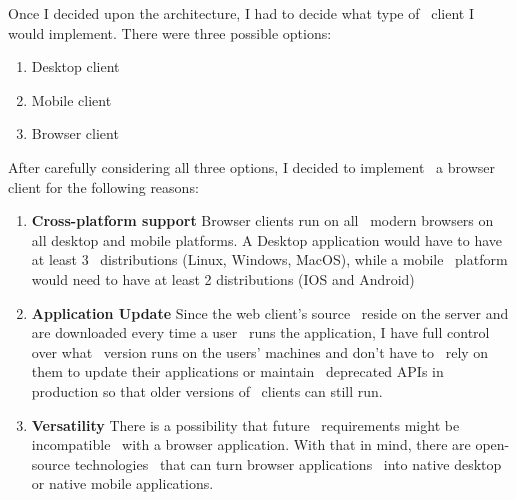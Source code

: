 Once I decided upon the architecture, I had to decide what type of \
client I would implement.
There were three possible options:
\begin{enumerate}
    \item Desktop client
    \item Mobile client
    \item Browser client
\end{enumerate}

After carefully considering all three options, I decided to implement \
a browser client for the following reasons:
\begin{enumerate}
    \item \textbf{Cross-platform support} Browser clients run on all \
            modern browsers on all desktop and mobile platforms.
            A Desktop application would have to have at least  3 \
            distributions (Linux, Windows, MacOS), while a mobile \
            platform would need to have at least 2 distributions
            (IOS and Android)
    \item \textbf{Application Update} Since the web client's source \
            reside on the server and are downloaded every time a user \
            runs the application, I have full control over what \
            version runs on the users' machines and don't have to \
            rely on them to update their applications or maintain \
            deprecated APIs in production so that older versions of \
            clients can still run.
    \item \textbf{Versatility} There is a possibility that future \
            requirements might be incompatible \
            with a browser application.
            With that in mind, there are open-source technologies \
            that can turn browser applications \
            into native desktop or native mobile applications.
\end{enumerate}




